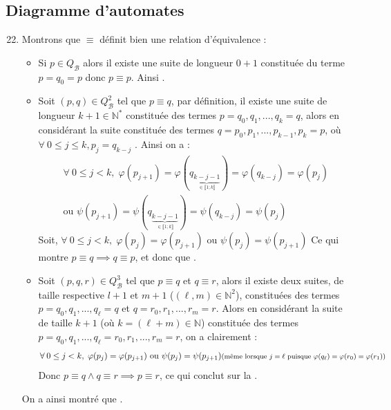 \documentclass{article}
\newcommand{\bb}[1]{\mathbb{#1}}
\begin{document}
\subsection{Diagramme d'automates}

\begin{enumerate}
    \setcounter{enumi}{21}

    \item Montrons que $\equiv$ définit bien une relation d'équivalence :
        \begin{itemize}
            \item Si $p \in Q_\mathcal{B}$ alors il existe une suite de longueur $0 + 1$ constituée du terme $ p = q_0 = p $ donc $p \equiv p $. Ainsi .
            \item Soit $(p,q) \in Q_\mathcal{B}^2$ tel que $p \equiv q$, par définition, il existe une suite de longueur $k + 1 \in \bb{N^*}$ constituée des termes $p = q_0, q_1,..., q_k = q$, alors en considérant la suite constituée des termes $q = p_0, p_1, ..., p_{k - 1}, p_k = p$, où $ \forall \: 0 \leq j \leq k, p_j = q_{k - j}$ . Ainsi on a : \begin{multline*}
                \forall \: 0 \leq j < k, \; \varphi(p_{j + 1}) = \varphi(q_{\underbrace{k - j - 1}_{\in \llbracket 1 ; k \rrbracket}}) = \varphi(q_{k - j}) = \varphi(p_j) \\
                \text{ou   }  \psi(p_{j + 1}) = \psi(q_{\underbrace{k - j - 1}_{\in \llbracket 1 ; k \rrbracket}}) = \psi(q_{k - j}) = \psi(p_j)
            \end{multline*}
            Soit, $\forall \: 0 \leq j < k, \; \varphi(p_j) = \varphi(p_{j + 1}) \text{ ou } \psi(p_j) = \psi(p_{j + 1})$ \newline
            Ce qui montre $p \equiv q \implies q \equiv p$, et donc que .
            \item Soit $(p, q, r) \in Q_\mathcal{B}^3$ tel que $p \equiv q$ et $q \equiv r$, alors il existe deux suites, de taille respective $l + 1$ et $m + 1$ ($(\ell, m) \in \bb{N}^2$), constituées des termes $p = q_0, q_1, ... , q_\ell = q$ et $ q = r_0, r_1, ... , r_m = r$. \newline
            Alors en considérant la suite de taille $ k + 1 $ (où $ k = (\ell + m) \in \bb{N}$) constituée des termes \newline
            $p = q_0, q_1, ... , q_\ell = r_0, r_1, ... , r_m = r$, on a clairement :
            \begin{align*} \forall \: 0 \leq j < k, \; \varphi(p_j) = \varphi(p_{j + 1}) \text{ ou } \psi(p_j) = \psi(p_{j + 1}) \text{\footnotesize{(même lorsque $j = \ell$ puisque $\varphi(q_\ell) = \varphi(r_0) = \varphi(r_1)$)}} \end{align*}
            Donc $p \equiv q \land q \equiv r \implies p \equiv r$, ce qui conclut sur la .
        \end{itemize}
        On a ainsi montré que .


\end{enumerate}
\end{document}
